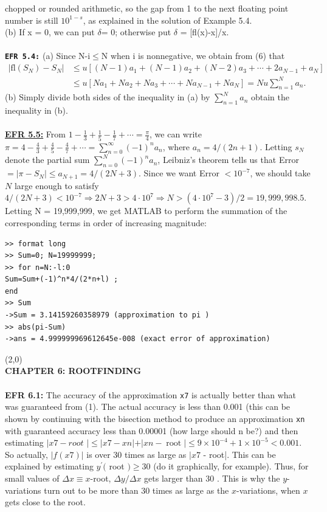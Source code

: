 \documentclass[../main.tex]{subfiles}
\begin{document}
chopped or rounded arithmetic, so the gap from 1 to the next floating point number is still $10^{1-s}$, as 
explained in the solution of Example 5.4.\\
(b) If x = 0, we can put $\delta$= 0; otherwise put $\delta$ = [fl(x)-x]/x.
\\
\\
\textbf{\texttt{EFR 5.4:}} (a) Since N-i$\leq$N when i is nonnegative, we obtain from (6) that 
$$
\begin{aligned}
\left|\mathrm{fl}\left(S_{N}\right)-S_{N}\right| & \leq u\left[(N-1) a_{1}+(N-1) a_{2}+(N-2) a_{3}+\cdots+2 a_{N-1}+a_{N}\right] \\
& \leq u\left[N a_{1}+N a_{2}+N a_{3}+\cdots+N a_{N-1}+N a_{N}\right]=N u \sum_{n=1}^{N} a_{n} .
\end{aligned}
$$
(b) Simply divide both sides of the inequality in (a) by $\sum_{n=1}^{N} a_{n}$ obtain the inequality in (b).  
\\
\\
\textbf{\underline{EFR 5.5:}} From $1-\frac{1}{3}+\frac{1}{5}-\frac{1}{7}+\cdots=\frac{\pi}{4}$, we can write $\pi=4-\frac{4}{3}+\frac{4}{5}-\frac{4}{7}+\cdots=\sum_{n=0}^{\infty}(-1)^{n} a_{n}$, where $a_{n}=4 /(2 n+1)$. Letting $s_{N}$ denote the partial sum $\sum_{n=0}^{N}(-1)^{n} a_{n}$, Leibniz's theorem tells us that Error $=\left|\pi-S_{N}\right| \leq a_{N+1}=4 /(2 N+3)$. Since we want Error $<10^{-7}$, we should take $N$ large enough to satisfy $4 /(2 N+3)<10^{-7} \Rightarrow 2 N+3>4 \cdot 10^{7} \Rightarrow N>\left(4 \cdot 10^{7}-3\right) / 2=19,999,998.5$. \\
Letting N = 19,999,999, we get MATLAB to perform the summation of the corresponding terms in 
order of increasing magnitude: 
\begin{lstlisting}[numbers=none,frame=none]
>> format long 
>> Sum=0; N=19999999; 
>> for n=N:-l:0 
Sum=Sum+(-1)^n*4/(2*n+l) ; 
end 
>> Sum 
->Sum = 3.14159260358979 (approximation to pi ) 
>> abs(pi-Sum) 
->ans = 4.999999969612645e-008 (exact error of approximation)
\end{lstlisting}
\line(2,0){\textwidth}\\
\textbf{CHAPTER 6: ROOTFINDING} 
\\
\\
\textbf{EFR 6.1:} The accuracy of the approximation \texttt{x7} is actually better than what was guaranteed from 
(1). The actual accuracy is less than 0.001 (this can be shown by continuing with the bisection method 
to produce an approximation \texttt{xn} with guaranteed accuracy less than 0.00001 (how large should n be?) and then estimating $\mid x7-root$ $|\leq| x 7-x n|+| x n-\operatorname{root} \mid \leq 9 \times 10^{-4}+1 \times 10^{-5}<0.001$. So actually, $|f(x 7)|$ is over 30 times as large as $\mid x 7$ - root|. This can be explained by estimating $y^{\prime}($ root $) \geq 30$ (do it graphically, for example). Thus, for small values of $\Delta x \equiv x$-root, $\Delta y / \Delta x$ gets larger than 30 . This is why the $y$-variations turn out to be more than 30 times as large as the $x$-variations, when $x$ gets close to the root.
\end{document}
